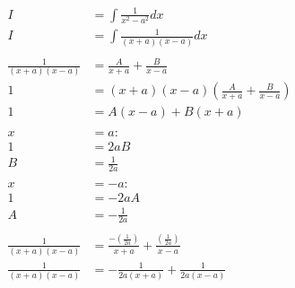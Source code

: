 \documentclass[12pt]{article}
\begin{document}
\begin{align}
    I                    & = \int \frac{1}{x^2-a^2} dx                                                      \\
    I                    & = \int \frac{1}{(x+a)(x-a)} dx                                                   \\
    \nonumber                                                                                               \\
    \frac{1}{(x+a)(x-a)} & = \frac{A}{x+a} + \frac{B}{x-a}                                                  \\
    1                    & = (x+a)(x-a)\left(\frac{A}{x+a} + \frac{B}{x-a}\right)                           \\
    1                    & = A(x-a) + B(x+a)                                                                \\
    \nonumber                                                                                               \\
    x                    & =a:                                                                              \\
    1                    & = 2aB                                                                            \\
    B                    & = \frac{1}{2a}                                                                   \\
    \nonumber                                                                                               \\
    x                    & =-a:                                                                             \\
    1                    & = -2aA                                                                           \\
    A                    & = -\frac{1}{2a}                                                                  \\
    \nonumber                                                                                               \\
    \frac{1}{(x+a)(x-a)} & = \frac{-\left(\frac{1}{2a}\right)}{x+a} + \frac{\left(\frac{1}{2a}\right)}{x-a} \\
    \frac{1}{(x+a)(x-a)} & = -\frac{1}{2a(x+a)} + \frac{1}{2a(x-a)}                                         \\

\end{align}
\end{document}
